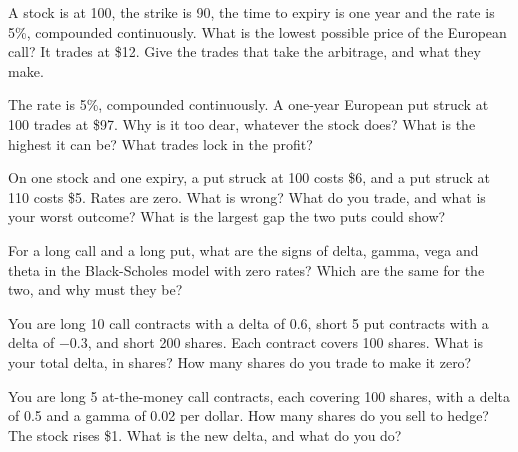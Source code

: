 \begin{question}\label{iq:iv2:options-parity-and-greeks:5}
A stock is at 100, the strike is 90, the time to expiry is one year and the rate is 5\%, compounded continuously. What is the lowest possible price of the European call? It trades at \$12. Give the trades that take the arbitrage, and what they make.
\end{question}

\begin{question}\label{iq:iv2:options-parity-and-greeks:6}
The rate is 5\%, compounded continuously. A one-year European put struck at 100 trades at \$97. Why is it too dear, whatever the stock does? What is the highest it can be? What trades lock in the profit?
\end{question}

\begin{question}\label{iq:iv2:options-parity-and-greeks:7}
On one stock and one expiry, a put struck at 100 costs \$6, and a put struck at 110 costs \$5. Rates are zero. What is wrong? What do you trade, and what is your worst outcome? What is the largest gap the two puts could show?
\end{question}

\begin{question}\label{iq:iv2:options-parity-and-greeks:8}
For a long call and a long put, what are the signs of delta, gamma, vega and theta in the Black-Scholes model with zero rates? Which are the same for the two, and why must they be?
\end{question}

\begin{question}\label{iq:iv2:options-parity-and-greeks:9}
You are long 10 call contracts with a delta of 0.6, short 5 put contracts with a delta of $-0.3$, and short 200 shares. Each contract covers 100 shares. What is your total delta, in shares? How many shares do you trade to make it zero?
\end{question}

\begin{question}\label{iq:iv2:options-parity-and-greeks:10}
You are long 5 at-the-money call contracts, each covering 100 shares, with a delta of 0.5 and a gamma of 0.02 per dollar. How many shares do you sell to hedge? The stock rises \$1. What is the new delta, and what do you do?
\end{question}

